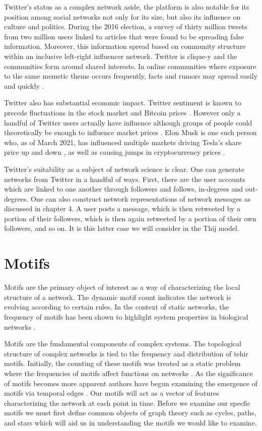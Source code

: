 Twitter's status as a complex network aside, the platform is also notable for its position among social networks not only for its size,
but also its influence on culture and politics. During the 2016 election, a survey of
thirty million tweets from two million users linked to articles that were found to be spreading
false information. Moreover, this information spread based on community structure within an inclusive left-right
influencer network. Twitter is clique-y and the communities form around 
shared interests. In online communities where exposure to the same memetic theme occurs frequently, 
facts and rumors may spread easily and quickly \cite{bessi}.

Twitter also has substantial economic impact. Twitter sentiment is known to precede fluctuations
in the stock market \cite{Bollen2011} and Bitcoin prices \cite{bitcoin}. However only a handful of Twitter users actually have influence 
although groups of people could theoretically be enough to influence market prices \cite{stonks}.
Elon Musk is one such person who, as of March 2021, has influenced multiple markets driving Tesla's share
price up and down \cite{elontweet}, as well as causing jumps in cryptocurrency prices  \cite{elontweet2} \cite{dogecoin}.

Twitter's suitability as a subject of network science is clear. One can generate networks from Twitter
 in a handful of ways. First, there are the user accounts which are linked to one another through 
followers and follows, in-degrees and out-degrees. One can also construct network representations 
of network messages as discussed in chapter 4. A user posts a message, which is then  
retweeted by a portion of their followers, which is then again retweeted by a portion of their own followers, and 
so on. It is this latter case we will consider in the Thij model.

\chapter{Motifs}
\label{section:Motifs}

Motifs are the primary object of interest as a way of characterizing the local structure of a
network. The dynamic motif count indicates the network is evolving according to certain rules.
In the context of static networks, the frequency of motifs 
has been shown to highlight system properties in biological networks \cite{biomotif} \cite{bioAlbert}.

Motifs are the fundamental components of complex systems.
The topological structure of complex networks
is tied to the frequency and distribution of tehir motifs. Initially, the counting of 
these motifs was treated as a static problem where the frequencies of motifs affect functions on networks \cite{motifdiscovery}.
As the significance of motifs becomes more apparent authors have begun examining the emergence of motifs 
via temporal edges \cite{temporalmotifs}. Our motifs will
act as a vector of features characterizing the network at each point in time. Before we
examine our specfic motifs we must first define common objects of graph theory such as cycles, paths, and stars
which will aid us in understanding the motifs we would like to examine.

